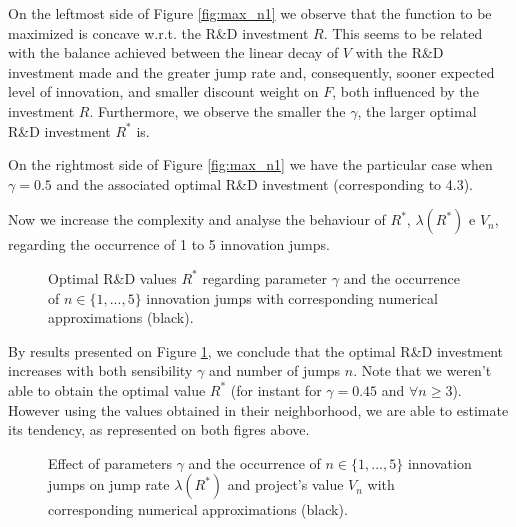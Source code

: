 On the leftmost side of Figure \ref{fig:max_n1} we observe that the function to be maximized is concave w.r.t. the R\&D investment $R$. This seems to be related with the balance achieved between the linear decay of $V$ with the R\&D investment made and the greater jump rate and, consequently, sooner expected level of innovation, and smaller discount weight on $F$, both influenced by the investment $R$. 
Furthermore, we observe the smaller the $\gamma$, the larger optimal R\&D investment $R^*$ is.



On the rightmost side of Figure \ref{fig:max_n1} we have the particular case when $\gamma=0.5$ and the associated optimal R\&D investment (corresponding to 4.3). %

Now we increase the complexity and analyse the behaviour of $R^*$, $\lambda(R^*)$ e $V_n$, regarding the occurrence of 1 to 5 innovation jumps.

\begin{figure}[!htb]
	\begin{subfigmatrix}{2}
	\end{subfigmatrix}
	\caption{Optimal R\&D values $R^*$ regarding parameter $\gamma$ and the occurrence of $n\in \{1,...,5\}$ innovation jumps with corresponding numerical approximations (black). }
	\label{fig:max_nR}
\end{figure}

By results presented on Figure \ref{fig:max_nR}, we conclude that the optimal R\&D investment increases with both sensibility $\gamma$ and number of jumps $n$. Note that we weren't able to obtain the optimal value $R^*$ (for instant for $\gamma=0.45$ and $\forall n\geq 3$). However using the values obtained in their neighborhood, we are able to estimate its tendency, as represented on both figres above.

\begin{figure}[!htb]
	\begin{subfigmatrix}{2}
	\end{subfigmatrix}
	\caption{Effect of parameters $\gamma$ and the occurrence of $n\in \{1,...,5\}$ innovation jumps on jump rate $\lambda(R^*)$ and project's value $V_n$ with corresponding numerical approximations (black). }
	\label{fig:max_n}
\end{figure}


